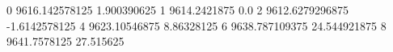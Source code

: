 0 9616.142578125 1.900390625
1 9614.2421875 0.0
2 9612.6279296875 -1.6142578125
4 9623.10546875 8.86328125
6 9638.787109375 24.544921875
8 9641.7578125 27.515625
